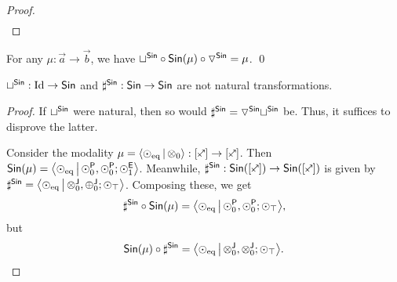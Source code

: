 \documentclass[a4paper]{memoir}
\begin{document}
{\begin{proof}
\begin{align*}
	\end{align*}
\end{proof}
\begin{corollary}
	For any $\mu : \vec a \to \vec b$, we have ${\sqcup}^{\mathsf{Sin}} \circ {\mathsf{Sin}}(\mu) \circ {\triangledown}^{\mathsf{Sin}} = \mu$. \qed
\end{corollary}
\begin{proposition}
	${\sqcup}^{\mathsf{Sin}} : \mathrm{Id} \to {\mathsf{Sin}}$ and $\sharp^{\mathsf{Sin}} : {\mathsf{Sin}} \to {\mathsf{Sin}}$ are not natural transformations.
\end{proposition}
\begin{proof}
	If ${\sqcup}^{\mathsf{Sin}}$ were natural, then so would $\sharp^{\mathsf{Sin}} = {\triangledown}^{\mathsf{Sin}} {\sqcup}^{\mathsf{Sin}}$ be.
	Thus, it suffices to disprove the latter.
	
	Consider the modality $\mu = \reshlist{\nonpol_\eqtydeg}{\mixpol_0} : [\ypolar] \to [\ypolar]$.
	Then ${\mathsf{Sin}}(\mu) = \mathopen{}\left\langle {\odot}_{\mathrm{eq}} \,\middle|\, {\odot}^{\mathsf{P}}_0, {\odot}^{\mathsf{P}}_0; {\odot}^{\mathsf{E}}_1 \right\rangle\mathclose{}$.
	Meanwhile, $\sharp^\Sin : \Sin([\ypolar]) \to \Sin([\ypolar])$ is given by $\sharp^{\mathsf{Sin}} = \mathopen{}\left\langle {\odot}_{\mathrm{eq}} \,\middle|\, {\otimes}^{\mathsf{J}}_0, {\oplus}^{\mathsf{J}}_0; {\odot}_\top \right\rangle\mathclose{}$.
	Composing these, we get
	\[
		\sharp^{\mathsf{Sin}} \circ {\mathsf{Sin}}(\mu) = \mathopen{}\left\langle {\odot}_{\mathrm{eq}} \,\middle|\, {\odot}^{\mathsf{P}}_0, {\odot}^{\mathsf{P}}_0; {\odot}_\top \right\rangle\mathclose{},
	\]
	but
	\[
		{\mathsf{Sin}}(\mu) \circ \sharp^{\mathsf{Sin}} = \mathopen{}\left\langle {\odot}_{\mathrm{eq}} \,\middle|\, {\otimes}^{\mathsf{J}}_0, {\otimes}^{\mathsf{J}}_0; {\odot}_\top \right\rangle\mathclose{}. \qedhere
	\]
\end{proof}

}
\end{document}
